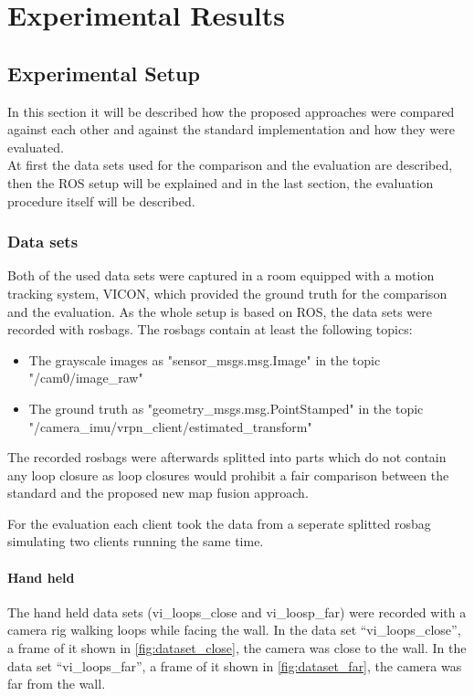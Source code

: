\chapter{Experimental Results}

\section{Experimental Setup}
In this section it will be described how the proposed approaches were compared against each other and against the standard implementation and how they were evaluated.\\
At first the data sets used for the comparison and the evaluation are described, then the \acf{ROS} setup will be explained and in the last section, the evaluation procedure itself will be described.

\subsection{Data sets}
Both of the used data sets were captured in a room equipped with a motion tracking system, VICON, which provided the ground truth for the comparison and the evaluation. As the whole setup is based on \ac{ROS}, the data sets were recorded with rosbags. The rosbags contain at least the following topics:
\begin{itemize}
  \item The grayscale images as "sensor\_msgs.msg.Image" in the topic "/cam0/image\_raw"
  \item The ground truth as "geometry\_msgs.msg.PointStamped" in the topic "/camera\_imu/vrpn\_client/estimated\_transform"
\end{itemize}

The recorded rosbags were afterwards splitted into parts which do not contain any loop closure as loop closures would prohibit a fair comparison between the standard and the proposed new map fusion approach.

For the evaluation each client took the data from a seperate splitted rosbag simulating two clients running the same time.

\subsubsection{Hand held}
The hand held data sets (vi\_loops\_close and vi\_loosp\_far) were recorded with a camera rig walking loops while facing the wall. In the data set ``vi\_loops\_close'', a frame of it shown in \autoref{fig:dataset_close}, the camera was close to the wall. In the data set ``vi\_loops\_far'', a frame of it shown in \autoref{fig:dataset_far}, the camera was far from the wall.

